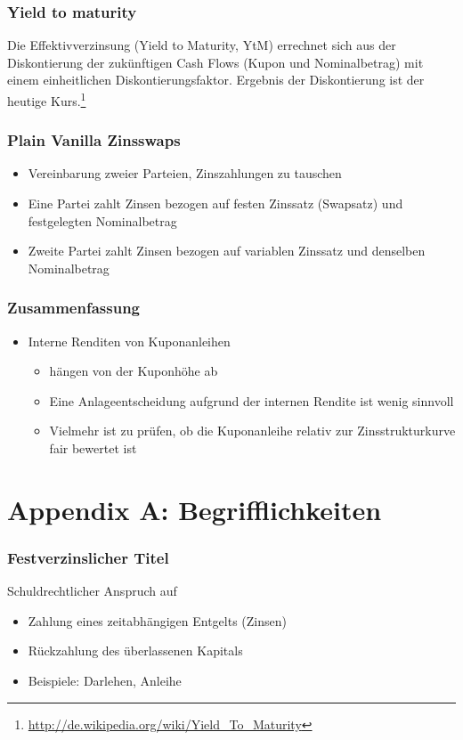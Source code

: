 \subsubsection{Yield to maturity}
Die Effektivverzinsung (Yield to Maturity, YtM) errechnet sich aus der Diskontierung der zukünftigen Cash Flows (Kupon und Nominalbetrag) mit einem einheitlichen Diskontierungsfaktor. Ergebnis der Diskontierung ist der heutige Kurs.\footnote{\url{http://de.wikipedia.org/wiki/Yield_To_Maturity}}

\subsubsection{Plain Vanilla Zinsswaps}
\begin{itemize}
	\item Vereinbarung zweier Parteien, Zinszahlungen zu tauschen
	\item Eine Partei zahlt Zinsen bezogen auf festen Zinssatz (Swapsatz) und festgelegten Nominalbetrag
	\item Zweite Partei zahlt Zinsen bezogen auf variablen Zinssatz und denselben Nominalbetrag
\end{itemize}

\subsubsection{Zusammenfassung}
\begin{itemize}
	\item Interne Renditen von Kuponanleihen
	\begin{itemize}
		\item hängen von der Kuponhöhe ab
		\item Eine Anlageentscheidung aufgrund der internen Rendite ist wenig sinnvoll
		\item Vielmehr ist zu prüfen, ob die Kuponanleihe relativ zur Zinsstrukturkurve fair bewertet ist
	\end{itemize}
\end{itemize}



\section{Appendix A: Begrifflichkeiten}

\subsubsection{Festverzinslicher Titel}
Schuldrechtlicher Anspruch auf
\begin{itemize}
	\item Zahlung eines zeitabhängigen Entgelts (Zinsen)
	\item Rückzahlung des überlassenen Kapitals
	\item Beispiele: Darlehen, Anleihe
\end{itemize}

